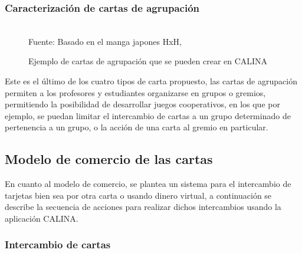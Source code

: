 \subsubsection{Caracterización de cartas de agrupación}

\begin{figure}[!htb]
\caption{Ejemplo de cartas de agrupación que se pueden crear en CALINA}
\label{img:modelodecartasgrupo}
\centering
\begin{adjustbox}{width=12cm}
\end{adjustbox}
\\
{\footnotesize Fuente: Basado en el manga japones HxH, }
\end{figure}

Este es el último de los cuatro tipos de carta propuesto, las cartas de agrupación permiten a los profesores y
estudiantes organizarse en grupos o gremios, permitiendo la posibilidad de desarrollar juegos cooperativos, en 
los que por ejemplo, se puedan limitar el intercambio de cartas a un grupo determinado de pertenencia a un 
grupo, o la acción de una carta al gremio en particular.

\subsection{Modelo de comercio de las cartas}

En cuanto al modelo de comercio, se plantea un sistema para el intercambio de tarjetas bien sea por otra carta
o usando dinero virtual, a continuación se describe la secuencia de acciones para realizar dichos intercambios 
usando la aplicación CALINA.

\subsubsection{Intercambio de cartas}

